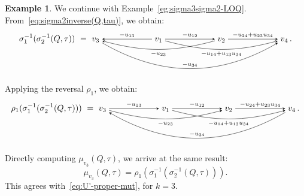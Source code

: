\documentclass[11pt, letterpaper]{amsart}
\newcommand{\hide}[1]{}
\theoremstyle{definition}
\newtheorem{example}[theorem]{Example}
\numberwithin{equation}{section}
\begin{document}
\begin{example}
\label{eg:rho4sigma3sigma2-Qtau}
We continue with Example~\ref{eg:sigma3sigma2-LOQ}. 
From~\eqref{eq:sigma2inverse(Q,tau)}, we obtain:
\vspace{2pt}
\begin{equation*}
\sigma_1^{-1}(\sigma_2^{-1}(Q,\tau))\ =\ \begin{tikzcd}[arrows={-stealth}, sep=small, cramped, sep=60]
v_3 \ar[rrr,  bend right=30, "-u_{34}"] &    
v_1 \ar[l, swap, "-u_{13}"] \ar[r, "-u_{12}"] \ar[rr, swap, bend right=15, "-u_{14}+u_{13}u_{34}"]  &    
v_2 \ar[r, "-u_{24}+u_{23}u_{34}"] \ar[ll, bend left=15, "-u_{23}"]  &    
v_4
\end{tikzcd}\,.
\vspace{-5pt}
\end{equation*}
Applying the reversal $\rho_1$, we obtain:
\vspace{2pt}
\begin{equation*}
\rho_1(\sigma_1^{-1}(\sigma_2^{-1}(Q,\tau)))\ =\ \begin{tikzcd}[arrows={-stealth}, sep=small, cramped, sep=60]
v_3  \ar[r, "-u_{13}"] \ar[rr, swap, bend right=15, "-u_{23}"]  &    
v_1 \ar[r, "-u_{12}"] \ar[rr, swap, bend right=15, "-u_{14}+u_{13}u_{34}"]  &    
v_2 \ar[r, "-u_{24}+u_{23}u_{34}"] &    
v_4 \ar[lll, swap, bend left=30, "-u_{34}"]
\end{tikzcd}\,. 
\vspace{-5pt}
\end{equation*}
Directly computing $\mu_{v_3}(Q,\tau)$, we arrive at the same result:
\begin{equation*}
\mu_{v_3}(Q,\tau) = \rho_1(\sigma_1^{-1}(\sigma_2^{-1}(Q,\tau))). 
\end{equation*}
This agrees with~\eqref{eq:U'-proper-mut}, for $k=3$. 
\end{example}

\hide{
Applying the reversal $\rho_4$ to the linearly ordered quiver $\sigma_3(\sigma_2(Q,\tau))$
given by~\eqref{eq:sigma3sigma2-LOQ},
we obtain the linearly ordered quiver 
\begin{equation}
\label{eq:rho4sigma3sigma2-LOQ}
\rho_4(\sigma_3(\sigma_2(Q,\tau)))\ =\ 
\begin{tikzcd}[arrows={-stealth}, sep=small, cramped, sep=60]
v_1 \ar[r, "-u_{13}+u_{12}u_{23}"] \ar[rr, swap, bend right=15, "-u_{14}+u_{12}u_{24}"] &    
v_3  \ar[r, "-u_{34}"]  \ar[rr, swap, bend right=15, "-u_{23}"] &    
v_4 \ar[r, "-u_{24}"] & 
v_2 \ar[lll, swap, bend left=30, "-u_{12}"] 
\end{tikzcd}\ . 
\vspace{-5pt}
\end{equation}
We note that the quiver in~\eqref{eq:rho4sigma3sigma2-LOQ} 
is nothing but $\mu_2(Q)$ (if we ignore the linear ordering). 
} %
\end{document}
